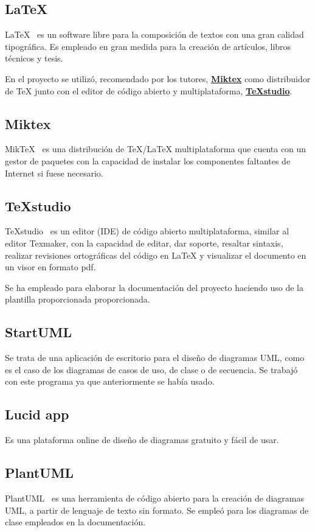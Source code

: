 \subsection{LaTeX}
LaTeX~\cite{pagina_latex} es un software libre para la composición de textos con una gran calidad tipográfica. Es empleado en gran medida para la creación de artículos, libros técnicos y tesis. 

En el proyecto se utilizó, recomendado por los tutores, \textbf{\href{https://miktex.org/}{Miktex}} como distribuidor de TeX junto con el editor de código abierto y multiplataforma, \textbf{\href{https://www.texstudio.org/}{TeXstudio}}. 

\subsection{Miktex} 
MikTeX~\cite{pagina_miktex} es una distribución de TeX/LaTeX multiplataforma que cuenta con un gestor de paquetes con la capacidad de instalar los componentes faltantes de Internet si fuese necesario.

\subsection{TeXstudio}
TeXstudio~\cite{pagina_texstudio} es un editor (IDE) de código abierto multiplataforma, similar al editor Texmaker, con la capacidad de editar, dar soporte, resaltar sintaxis, realizar revisiones ortográficas del código en LaTeX y visualizar el documento en un visor en formato pdf.

Se ha empleado para elaborar la documentación del proyecto haciendo uso de la plantilla proporcionada proporcionada.

\subsection{StartUML}
Se trata de una aplicación de escritorio para el diseño de diagramas UML, como es el caso de los diagramas de casos de uso, de clase o de secuencia. Se trabajó con este programa ya que anteriormente se había usado.

\subsection{Lucid app}
Es una plataforma online de diseño de diagramas gratuito y fácil de usar.

\subsection{PlantUML}
PlantUML~\cite{pagina_PlantUML} es una herramienta de código abierto para la creación de diagramas UML, a partir de lenguaje de texto sin formato. Se empleó para los diagramas de clase empleados en la documentación.

